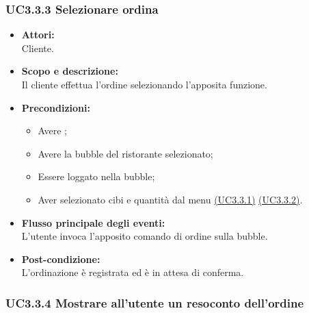 \subsubsection{UC3.3.3 Selezionare ordina} \label{UC3.3.3}

\begin{itemize}
	\item \textbf{Attori:}
	\\Cliente.
	\item \textbf{Scopo e descrizione:} 
	\\Il cliente effettua l’ordine selezionando l’apposita funzione.
	\item \textbf{Precondizioni:}
	\begin{itemize}
		\item Avere ;
		\item Avere la bubble del ristorante selezionato;
		\item Essere loggato nella bubble;
		\item Aver selezionato cibi e quantità dal menu \hyperref[UC3.3.1]{(UC3.3.1)} \hyperref[UC3.3.2]{(UC3.3.2)}.
	\end{itemize}
	\item \textbf{Flusso principale degli eventi:}
	\\L'utente invoca l'apposito comando di ordine sulla bubble.
	\item \textbf{Post-condizione:}
	\\L’ordinazione è registrata ed è in attesa di conferma.
\end{itemize}

\subsubsection{UC3.3.4 Mostrare all’utente un resoconto dell’ordine} \label{UC3.3.4}

